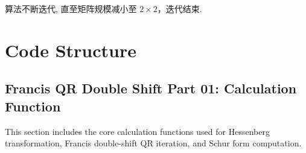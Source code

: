 \documentclass[12pt, a4paper]{ctexart}
\begin{document}
\par

算法不断迭代, 直至矩阵规模减小至 $2 \times 2$，迭代结束. 

\par

\section{Code Structure}

\subsection*{Francis QR Double Shift Part 01: Calculation Function}
This section includes the core calculation functions used for Hessenberg transformation, Francis double-shift QR iteration, and Schur form computation.
\end{document}
